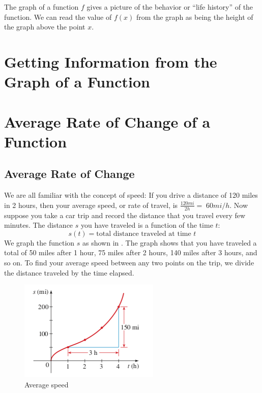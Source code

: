 \documentclass[openright]{memoir}
\begin{document}
The graph of a
function
$f$ gives a picture of the behavior or “life history” of the function. We can
read the value of $f(x)$ from the graph as being the height of the graph above
the point $x$.

\Blindtext[2]

\section{Getting Information from the Graph of a Function}

\blindmathpaper

\section{Average Rate of Change of a Function}

\subsection{Average Rate of Change}

We are all familiar with the concept of speed: If you drive a distance of 120
miles in 2 hours, then your average speed, or rate of travel, is $\frac{120
    mi}{2 h} = 􏱁 60 mi/h$. Now suppose you take a car trip and record the
    distance that you travel every few minutes. The distance $s$ you have
    traveled is a function of the time $t$: \[ s(t) = \text{total distance
        traveled at time } t \] We graph the function $s$ as shown in
        . The graph shows that you have traveled a total of 50
        miles after 1 hour, 75 miles after 2 hours, 140 miles after 3 hours,
        and so on. To find your average speed between any two points on the
        trip, we divide the distance traveled by the time elapsed.

\begin{figure} \centering\includegraphics[scale=.6]{figure1} \caption{Average
    speed}\label{fig:1} \end{figure}
\end{document}
